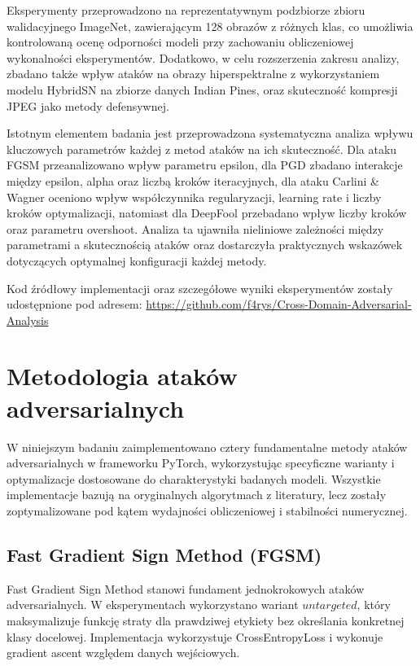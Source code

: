 \documentclass[12pt]{article}
\begin{document}
Eksperymenty przeprowadzono na reprezentatywnym podzbiorze zbioru walidacyjnego ImageNet, zawierającym 128 obrazów z różnych klas, co umożliwia kontrolowaną ocenę odporności modeli przy zachowaniu obliczeniowej wykonalności eksperymentów. Dodatkowo, w celu rozszerzenia zakresu analizy, zbadano także wpływ ataków na obrazy hiperspektralne z wykorzystaniem modelu HybridSN na zbiorze danych Indian Pines, oraz skuteczność kompresji JPEG jako metody defensywnej. 

Istotnym elementem badania jest przeprowadzona systematyczna analiza wpływu kluczowych parametrów każdej z metod ataków na ich skuteczność. Dla ataku FGSM przeanalizowano wpływ parametru epsilon, dla PGD zbadano interakcje między epsilon, alpha oraz liczbą kroków iteracyjnych, dla ataku Carlini \& Wagner oceniono wpływ współczynnika regularyzacji, learning rate i liczby kroków optymalizacji, natomiast dla DeepFool przebadano wpływ liczby kroków oraz parametru overshoot. Analiza ta ujawniła nieliniowe zależności między parametrami a skutecznością ataków oraz dostarczyła praktycznych wskazówek dotyczących optymalnej konfiguracji każdej metody.

Kod źródłowy implementacji oraz szczegółowe wyniki eksperymentów zostały udostępnione pod adresem: \url{https://github.com/f4rys/Cross-Domain-Adversarial-Analysis}

\section{Metodologia ataków adversarialnych}

W niniejszym badaniu zaimplementowano cztery fundamentalne metody ataków adversarialnych w frameworku PyTorch, wykorzystując specyficzne warianty i optymalizacje dostosowane do charakterystyki badanych modeli. Wszystkie implementacje bazują na oryginalnych algorytmach z literatury, lecz zostały zoptymalizowane pod kątem wydajności obliczeniowej i stabilności numerycznej.

\subsection{Fast Gradient Sign Method (FGSM)}

Fast Gradient Sign Method \supercite{goodfellow2014explaining} stanowi fundament jednokrokowych ataków adversarialnych. W eksperymentach wykorzystano wariant $untargeted$, który maksymalizuje funkcję straty dla prawdziwej etykiety bez określania konkretnej klasy docelowej. Implementacja wykorzystuje CrossEntropyLoss i wykonuje gradient ascent względem danych wejściowych.
\end{document}
